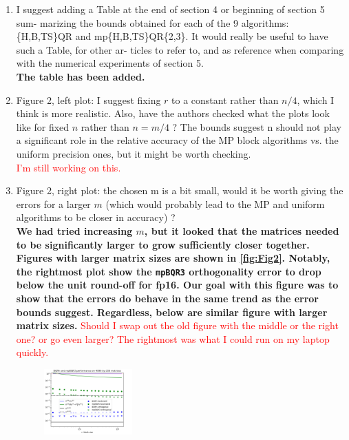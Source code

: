 \documentclass[final,onefignum,onetabnum]{siamart190516}
\newcommand{\red}[1]{\textcolor{red}{#1}}
\begin{document}
\begin{enumerate}
{\bf We have discussed the above two points in this part of the discussion.}
\red{Can someone check to see that I addressed these points OK?}
    \item I suggest adding a Table at the end of section 4 or beginning of section 5 sum- marizing the bounds obtained for each of the 9 algorithms: \{H,B,TS\}QR and mp\{H,B,TS\}QR\{2,3\}. It would really be useful to have such a Table, for other ar- ticles to refer to, and as reference when comparing with the numerical experiments of section 5.\\
    {\bf The table has been added.}
    \item Figure 2, left plot: I suggest fixing $r$ to a constant rather than $n/4$, which I think is more realistic. Also, have the authors checked what the plots look like for fixed $n$ rather than $n = m/4$ ? The bounds suggest n should not play a significant role in the relative accuracy of the MP block algorithms vs. the uniform precision ones, but it might be worth checking.\\
    \red{I'm still working on this.}
    \item Figure 2, right plot: the chosen m is a bit small, would it be worth giving the errors for a larger $m$ (which would probably lead to the MP and uniform algorithms to be closer in accuracy) ?\\
    {\bf We had tried increasing $m$, but it looked that the matrices needed to be significantly larger to grow sufficiently closer together. Figures with larger matrix sizes are shown in \cref{fig:Fig2}. Notably, the rightmost plot show the {\tt mpBQR3} orthogonality error to drop below the unit round-off for fp16. Our goal with this figure was to show that the errors do behave in the same trend as the error bounds suggest. Regardless, below are similar figure with larger matrix sizes.}
    \red{Should I swap out the old figure with the middle or the right one? or go even larger? The rightmost was what I could run on my laptop quickly.} 
    \begin{figure}[h!]
        \centering
        \vspace{-10pt}
        \includegraphics[width=0.32\textwidth]{./figures/12-08.png}

\end{figure}
\end{enumerate}
\end{document}

